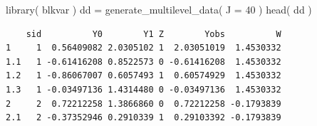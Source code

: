 \documentclass[
  letterpaper,
  DIV=11,
  numbers=noendperiod]{scrreprt}
\newenvironment{Shaded}{}{}
\newcommand{\AttributeTok}[1]{\textcolor[rgb]{0.49,0.56,0.16}{#1}}
\newcommand{\DecValTok}[1]{\textcolor[rgb]{0.25,0.63,0.44}{#1}}
\newcommand{\FunctionTok}[1]{\textcolor[rgb]{0.02,0.16,0.49}{#1}}
\newcommand{\NormalTok}[1]{#1}
\newcommand{\OtherTok}[1]{\textcolor[rgb]{0.00,0.44,0.13}{#1}}
\newcommand{\SpecialCharTok}[1]{\textcolor[rgb]{0.25,0.44,0.63}{#1}}
\begin{document}
\begin{Shaded}
\begin{Highlighting}[]
\FunctionTok{library}\NormalTok{( blkvar )}
\NormalTok{dd }\OtherTok{=} \FunctionTok{generate\_multilevel\_data}\NormalTok{( }\AttributeTok{J =} \DecValTok{40}\NormalTok{ )}
\FunctionTok{head}\NormalTok{( dd )}
\end{Highlighting}
\end{Shaded}

\begin{verbatim}
    sid          Y0        Y1 Z        Yobs          W
1     1  0.56409082 2.0305102 1  2.03051019  1.4530332
1.1   1 -0.61416208 0.8522573 0 -0.61416208  1.4530332
1.2   1 -0.86067007 0.6057493 1  0.60574929  1.4530332
1.3   1 -0.03497136 1.4314480 0 -0.03497136  1.4530332
2     2  0.72212258 1.3866860 0  0.72212258 -0.1793839
2.1   2 -0.37352946 0.2910339 1  0.29103392 -0.1793839
\end{verbatim}

\begin{Shaded}
\end{Shaded}
\end{document}
